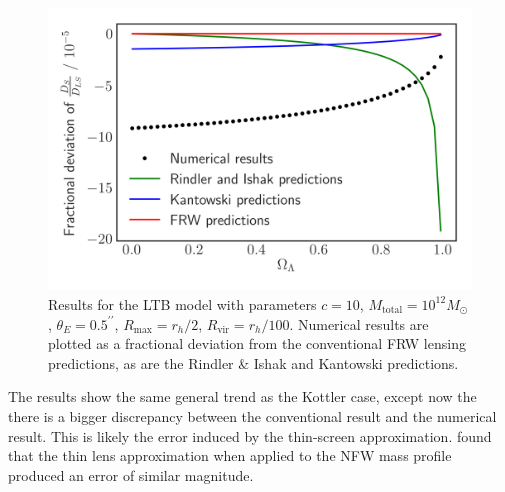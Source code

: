 \begin{figure}
  \centering
  \includegraphics[height=0.5\linewidth]{images/ltb.png}
  \caption{Results for the LTB model with parameters $c = 10$, $M_{\text{total}} = 10^{12} M_\odot$, $\theta_E = 0.5^{\prime\prime}$, $R_{\text{max}} = r_h/2$, $R_{\text{vir}} = r_h/100$. Numerical results are plotted as a fractional deviation from the conventional FRW lensing predictions, as are the Rindler \& Ishak and Kantowski predictions. }
  \label{fig:ltb-results}
\end{figure}

The results show the same general trend as the Kottler case, except now the there is a bigger discrepancy between the conventional result and the numerical result. This is likely the error induced by the thin-screen approximation. \citet{frittelli2011accuracy} found that the thin lens approximation when applied to the NFW mass profile produced an error of similar magnitude. 